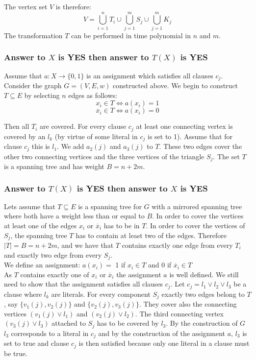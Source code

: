 \documentclass[12pt]{report}
\begin{document}
The vertex set $V$ is therefore:
$$V = \bigcup_{i=1}^{n}{T_i} \cup \bigcup_{j=1}^{m}{S_j} \cup \bigcup_{j=1}^{m}{K_j}$$
The transformation $T$ can be performed in time polynomial in $n$ and $m$.

\subsubsection{Answer to $X$ is YES then answer to $T(X)$ is YES}
Assume that $a: X \rightarrow \{0,1\}$ is an assignment which satisfies all clauses $c_j$. Consider the graph $G = (V,E,w)$ constructed above. We begin to construct $T \subseteq E$ by selecting $n$ edges as follows:
$$x_i \in T \Leftrightarrow a(x_i) = 1$$
$$\overline{x}_i \in T \Leftrightarrow a(x_i) = 0$$

Then all $T_i$ are covered. For every clause $c_j$ at least one connecting vertex is covered by an $l_k$ (by virtue of some literal in $c_j$ is set to 1). Assume that for clause $c_j$ this is $l_1$. We add $a_2(j)$ and $a_3(j)$ to $T$. These two edges cover the other two connecting vertices and the three vertices of the triangle $S_j$. The set $T$ is a spanning tree and has weight $B = n + 2m$.

\subsubsection{Answer to $T(X)$ is YES then answer to $X$ is YES}
Lets assume that $T \subseteq E$ is a spanning tree for $G$ with a mirrored spanning tree where both have a weight less than or equal to $B$. In order to cover the vertices at least one of the edges $x_i$ or $\overline{x}_i$ has to be in $T$. In order to cover the vertices of $S_j$, the spanning tree $T$ has to contain at least two of the edges. Therefore $|T| = B = n + 2m$, and we have that $T$ contains exactly one edge from every $T_i$ and exactly two edge from every $S_j$.\\
We define an assignment: $a(x_i) =$ 1 if $x_i \in T$ and 0 if $\overline{x}_i \in T$\\
As $T$ contains exactly one of $x_i$ or $\overline{x}_i$ the assignment $a$ is well defined. We still need to show that the assignment satisfies all clauses $c_j$. Let $c_j = l_1 \vee l_2 \vee l_3$ be a clause where $l_k$ are literals. For every component $S_j$ exactly two edges belong to $T$, say $\{v_1(j),v_2(j)\}$ and $\{v_2(j),v_3(j)\}$. They cover also the connecting vertices $(v_1(j) \vee l_1)$ and $(v_2(j) \vee l_2)$. The third connecting vertex $(v_3(j) \vee l_3)$ attached to $S_j$ has to be covered by $l_3$. By the construction of $G$ $l_3$ corresponds to a literal in $c_j$ and by the construction of the assignment $a$, $l_3$ is set to true and clause $c_j$ is then satisfied because only one literal in a clause must be true.
\end{document}
